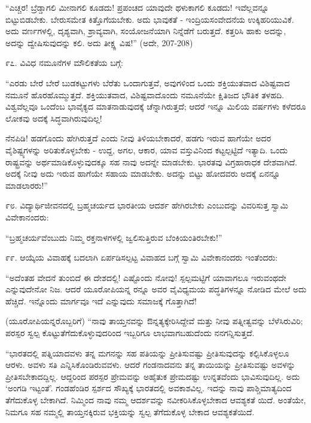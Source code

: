 “ಎಚ್ಚರ! ಬ್ರೆಡ್ಡಾಗಲಿ ಮೀನಾಗಲಿ ಕೂಡದು! ಪ್ರಪಂಚದ ಯಾವುದೇ ಥಳುಕಾಗಲಿ ಕೂಡದು! ಇವೆಲ್ಲವನ್ನೂ ಬಿಟ್ಟುಬಿಡಬೇಕು. ಬೇರುಸಮೇತ ಕಿತ್ತೊಗೆಯಬೇಕು. ಅದು ಭಾವುಕತೆ - ಇಂದ್ರಿಯಸಂವೇದನೆಯ ಉಕ್ಕಿಹರಿಯುವಿಕೆ. ಅದು ವರ್ಣಗಳಲ್ಲಿ, ದೃಶ್ಯವಾಗಿ, ಶ್ರಾವ್ಯವಾಗಿ, ಸಂಯೋಜನೆಯಾಗಿ ನಿನ್ನೆಡೆಗೆ ಬರುತ್ತದೆ. ಕತ್ತರಿಸಿ ಹಾಕು ಅದನ್ನು, ಅದನ್ನು ದ್ವೇಷಿಸುವುದನ್ನು ಕಲಿ. ಅದು ತೀಕ್ಷ್ಣ ವಿಷ!” (ಅದೇ, 207-208)

೯೭. ವಿವಿಧ ನಮೂನೆಗಳ ಮೌಲಿಕತೆಯ ಬಗ್ಗೆ:

“ಎರಡು ಬೇರೆ ಬೇರೆ ಬುಡಕಟ್ಟುಗಳು ಬೆರೆತು ಒಂದಾಗುತ್ತವೆ, ಅವುಗಳಿಂದ ಒಂದು ಶಕ್ತಿಯುತವಾದ ವಿಶಿಷ್ಟವಾದ ನಮೂನೆ ಹೊರಹೊಮ್ಮುತ್ತದೆ. ಶಕ್ತಿಯುತವಾದ, ವಿಶಿಷ್ಟವಾದೊಂದು ನಮೂನೆಯೇ ಕ್ಷಿತಿಜದ ಭೌತಿಕ ತಳಹದಿ. ವಿಶ್ವವೆಲ್ಲವೂ ಒಂದೆಂಬ ಭಾವೈಕ್ಯದ ಮಾತನಾಡುವುದಕ್ಕೆ ಚೆನ್ನಾಗಿರುತ್ತದೆ; ಆದರೆ ಇನ್ನೂ ಮಿಲಿಯ ವರ್ಷಗಳು ಕಳೆದರೂ ಲೋಕವು ಅದಕ್ಕೆ ಸಿದ್ಧವಾಗಿರುವುದಿಲ್ಲ!

ನೆನಪಿಡಿ! ಹಡಗೊಂದು ಹೇಗಿರುತ್ತದೆ ಎಂದು ನೀವು ತಿಳಿಯಬೇಕಾದರೆ, ಹಡಗು ಇರುವ ಹಾಗೆಯೇ ಅದರ ವೈಶಿಷ್ಟ್ಯಗಳನ್ನು ಅರಿತುಕೊಳ್ಳಬೇಕು - ಉದ್ದ, ಅಗಲ, ಆಕಾರ, ಯಾವ ವಸ್ತುವಿನಿಂದ ಕಟ್ಟಲ್ಪಟ್ಟಿದೆ ಇತ್ಯಾದಿ. ಒಂದು ರಾಷ್ಟ್ರವನ್ನು ಅರ್ಥಮಾಡಿಕೊಳ್ಳುವುದಕ್ಕೂ ಸಹ ನಾವು ಅದನ್ನೇ ಮಾಡಬೇಕು. ಭಾರತವು ವಿಗ್ರಹಾರಾಧಕ ದೇಶವಾಗಿದೆ. ಅದಕ್ಕೆ ನೀವು ಅದು ಇರುವ ಹಾಗೆಯೇ ಸಹಾಯ ಮಾಡಬೇಕು. ಅದನ್ನು ಬಿಟ್ಟು ಹೋದವರು ಅದಕ್ಕೆ ಏನನ್ನೂ ಮಾಡಲಾರರು!” 

೯೮. ವಿದ್ಯಾರ್ಥಿಜೀವನದಲ್ಲಿ ಬ್ರಹ್ಮಚರ್ಯದ ಭಾರತೀಯ ಆದರ್ಶ ಹೇಗಿರಬೇಕು ಎಂಬುದನ್ನು ವಿವರಿಸುತ್ತ ಸ್ವಾಮಿ ವಿವೇಕಾನಂದರು:

“ಬ್ರಹ್ಮಚರ್ಯವೆಂಬುದು ನಿಮ್ಮ ರಕ್ತನಾಳಗಳಲ್ಲಿ ಜ್ವಲಿಸುತ್ತಿರುವ ಬೆಂಕಿಯಂತಿರಬೇಕು!” 

೯೯. ಆಯ್ಕೆಯ ವಿವಾಹಕ್ಕೆ ಬದಲಾಗಿ ಏರ್ಪಡಿಸಲ್ಪಟ್ಟ ವಿವಾಹದ ಬಗ್ಗೆ ಸ್ವಾಮಿ ವಿವೇಕಾನಂದರು ಇಂತೆಂದರು:

“ಅದೆಂತಹ ವೇದನೆ ತುಂಬಿದೆ ಈ ದೇಶದಲ್ಲಿ! ಎಷ್ಟೊಂದು ನೋವು! ಸ್ಪಲ್ಪಮಟ್ಟಿಗೆ ಯಾವಾಗಲೂ ಇರುವಂಥದೇ ಎನ್ನುವುದೇನೋ ನಿಜ. ಆದರೆ ಯೂರೋಪಿಯನ್ನ ರನ್ನೂ ಅವರ ವೈವಿಧ್ಯಮಯ ಪದ್ಧತಿಗಳನ್ನೂ ನೋಡಿದ ಮೇಲೆ ಅದು ಹೆಚ್ಚಿದೆ. ಇನ್ನೊಂದು ಮಾರ್ಗವೂ ಇದೆ ಎನ್ನುವುದು ಸಮಾಜಕ್ಕೆ ಗೊತ್ತಾಗಿದೆ!

(ಯೂರೋಪಿಯನ್ನರೊಬ್ಬರಿಗೆ) “ನಾವು ತಾಯ್ತನವನ್ನು ಔನ್ನತ್ಯಕ್ಕೇರಿಸಿದ್ದೇವೆ ಮತ್ತು ನೀವು ಪತ್ನೀತ್ವವನ್ನು ಬೆಳೆಸಿರುವಿರಿ; ಪರಸ್ಪರ ಸ್ವಲ್ಪ ಕೊಟ್ಟುತೆಗೆದುಕೊಳ್ಳುವುದರಿಂದ ಇಬ್ಬರಿಗೂ ಲಾಭವಾಗಬಹುದೆಂದು ನನಗನ್ನಿಸುತ್ತದೆ.

“ಭಾರತದಲ್ಲಿ ಪತ್ನಿಯಾದವಳು ತನ್ನ ಮಗನನ್ನು ಸಹ ಪತಿಯನ್ನು ಪ್ರೀತಿಸುವಷ್ಟು ಪ್ರೀತಿಸುವುದನ್ನು ಕಲ್ಪಿಸಿಕೊಳ್ಳಲೂ ಆರಳು. ಅವಳು ಸತಿ ಎನ್ನಿಸಿಕೊಂಡಿರುವವಳು. ಆದರೆ ಗಂಡನಾದವನು ತನ್ನ ತಾಯಿಯನ್ನು ಪ್ರೀತಿಸುವಷ್ಟು ಅವಳನ್ನು ಪ್ರೀತಿಸಬೇಕಾದದ್ದಿಲ್ಲ. ಆದ್ದರಿಂದ ಪರಸ್ಪರ ಪ್ರೇಮವನ್ನು ಅಹೈತುಕ ಪ್ರೇಮದಷ್ಟು ಉನ್ನತವೆಂದು ಭಾವಿಸುವುದಿಲ್ಲ. ಅದು ‘ಅಂಗಡಿ ಇಟ್ಟಂತೆ’. ಗಂಡಹೆಂಡಿರ ಸ್ಪರ್ಶದ ಸೌಖ್ಯಕ್ಕೆ ಭಾರತದಲ್ಲಿ ಅವಕಾಶವಿಲ್ಲ. ಇದನ್ನು ನಾವು ಪಾಶ್ಚಿಮಾತ್ಯದಿಂದ ತೆಗೆದುಕೊಳ್ಳ ಬೇಕಾಗಿದೆ. ನಿಮ್ಮಿಂದ ನಾವು ನಮ್ಮ ಆದರ್ಶವನ್ನು ನವೀಕರಿಸಿಕೊಳ್ಳಬೇಕಾದ ಆವಶ್ಯಕತೆ ಯಿದೆ. ಅಂತೆಯೇ, ನಿಮಗೂ ಸಹ ನಮ್ಮಲ್ಲಿ ತಾಯ್ತನಕ್ಕಿರುವ ಭಕ್ತಿಯನ್ನು ಸ್ವಲ್ಪ ತೆಗೆದುಕೊಳ್ಳ ಬೇಕಾದ ಆವಶ್ಯಕತೆಯಿದೆ. 

